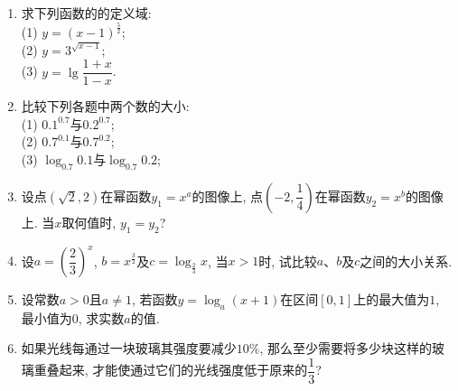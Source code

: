 \documentclass[10pt,a4paper]{article}
\begin{document}
\begin{enumerate}[1.]
{}{
}
\vspace*{3cm}
\item 求下列函数的的定义域:\\
(1) $y=(x-1)^{\frac 52}$;\\
(2) $y=3^{\sqrt{x-1}}$;\\
(3) $y=\lg \dfrac{1+x}{1-x}$.
\vspace*{3cm}
\item 比较下列各题中两个数的大小:\\
(1) $0.1^{0.7}$与$0.2^{0.7}$;\\
(2) $0.7^{0.1}$与$0.7^{0.2}$;\\
(3) $\log_{0.7}0.1$与$\log_{0.7}0.2$;
\vspace*{3cm}
\item 设点$(\sqrt 2, 2)$在幂函数$y_1=x^a$的图像上, 点$(-2,\dfrac 14)$在幂函数$y_2=x^b$的图像上. 当$x$取何值时, $y_1=y_2$?
\vspace*{3cm}
\item 设$a=(\dfrac 23)^x$, $b=x^{\frac 32}$及$c=\log_\frac{2}{3}x$, 当$x>1$时, 试比较$a$、$b$及$c$之间的大小关系.
\vspace*{3cm}
\item 设常数$a>0$且$a\ne 1$, 若函数$y=\log_a(x+1)$在区间$[0, 1]$上的最大值为$1$, 最小值为$0$, 求实数$a$的值.
\vspace*{3cm}
\item 如果光线每通过一块玻璃其强度要减少$10\%$, 那么至少需要将多少块这样的玻璃重叠起来, 才能使通过它们的光线强度低于原来的$\dfrac 13$? 
\vspace*{3cm}
\end{enumerate}
\end{document}
